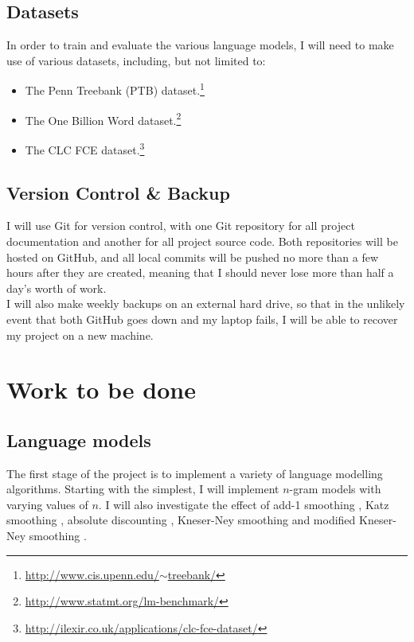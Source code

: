 \documentclass[a4paper, 12pt]{article}
\newcommand{\hlink}[2]{{\href{#1}{#2}}}
\begin{document}
\subsection*{Datasets}
In order to train and evaluate the various language models, I will need to make use of various datasets, including, but not limited to:
\begin{itemize}
\item
	The Penn Treebank (PTB) dataset.\footnote{\hlink{http://www.cis.upenn.edu/~treebank/}{http://www.cis.upenn.edu/$\sim$treebank/}}
\item
	The One Billion Word dataset.\footnote{\hlink{http://www.statmt.org/lm-benchmark/}{http://www.statmt.org/lm-benchmark/}}
\item
	The CLC FCE dataset.\footnote{\hlink{http://ilexir.co.uk/applications/clc-fce-dataset/}{http://ilexir.co.uk/applications/clc-fce-dataset/}}
\end{itemize}

\subsection*{Version Control \& Backup}
I will use Git for version control, with one Git repository for all project documentation and another for all project source code. Both repositories will be hosted on GitHub, and all local commits will be pushed no more than a few hours after they are created, meaning that I should never lose more than half a day's worth of work. \\

\noindent
I will also make weekly backups on an external hard drive, so that in the unlikely event that both GitHub goes down and my laptop fails, I will be able to recover my project on a new machine.

\section*{Work to be done}

\subsection*{Language models}
The first stage of the project is to implement a variety of language modelling algorithms. Starting with the simplest, I will implement $n$-gram models with varying values of $n$. I will also investigate the effect of add-1 smoothing \cite{add1}, Katz smoothing \cite{katz}, absolute discounting \cite{absdisc}, Kneser-Ney smoothing \cite{kneser} and modified Kneser-Ney smoothing \cite{modkneser}. \\
\end{document}
